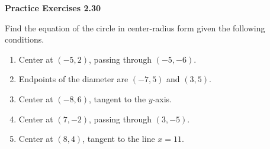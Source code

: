 \vspace{0.3ex}
\noindent\textbf{Practice Exercises 2.30}

\vspace{0.2ex}

Find the equation of the circle in center-radius form given the following conditions.

\begin{enumerate}
    \item Center at $(-5, 2)$, passing through $(-5, -6)$.
    \item Endpoints of the diameter are $(-7, 5)$ and $(3, 5)$.
    \item Center at $(-8, 6)$, tangent to the $y$-axis.
    \item Center at $(7, -2)$, passing through $(3, -5)$.
    \item Center at $(8, 4)$, tangent to the line $x = 11$.
\end{enumerate}
